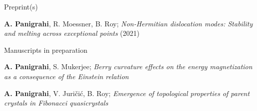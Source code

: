 

\begin{cventries}

  \cventry
    {Preprint(s)} %
    {} %
    {} %
    {} %
    {
      \begin{cvitems} %
      	\item{\textbf{A. Panigrahi}, R. Moessner, B. Roy; \textit{Non-Hermitian dislocation modes: Stability and melting across exceptional points} (2021) }
      \end{cvitems}
    }

	\cventry
	{Manuscripts in preparation} %
	{} %
	{} %
	{} %
	{
	\begin{cvitems} %
		\item{\textbf{A. Panigrahi}, S. Mukerjee; \textit{Berry curvature effects on the energy magnetization as a consequence of the Einstein relation}}
		\item{\textbf{A. Panigrahi}, V. Juri\v{c}i\'c, B. Roy; \textit{Emergence of topological properties of parent crystals in Fibonacci quasicrystals}}
	\end{cvitems}
	}
\end{cventries}
